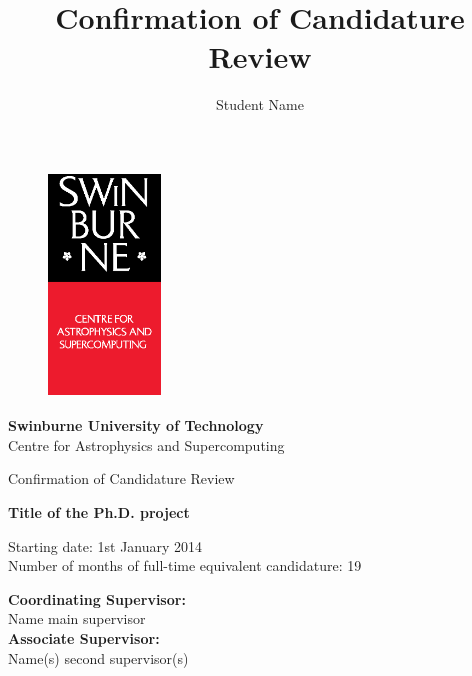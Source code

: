 \documentclass[useAMS,usenatbib,onecolumn]{mnras}
\title{Confirmation of Candidature Review}
\author[Student Name]
 {Student Name}
\begin{document}
\fontsize{11}{12.5}\selectfont
\begin{center}

\begin{figure}
\begin{center}
\includegraphics[height=6cm,width=3cm]{./astro_v.eps}
\end{center}
\end{figure}

{\bf \LARGE S\Large winburne \LARGE U\Large niversity of  \LARGE T\Large echnology\\
\vspace{0.5cm}}
\LARGE C\Large entre for \LARGE A\Large strophysics and \LARGE S\Large upercomputing\\
\vspace{0.5cm}

\large Confirmation of Candidature Review\\
\vspace{0.5cm}



\Huge{\bf Title of the Ph.D. project}

\vspace{3cm}
\large{Starting date: 1st January 2014\\}
\vspace{0.2cm}
\large{Number of months of full-time equivalent candidature: 19}
\vspace{0.5cm}
\end{center}


\begin{flushleft}
{\bf Coordinating Supervisor:}\\
Name main supervisor\\
\vspace{0.5cm}
{\bf Associate Supervisor:}\\
Name(s) second supervisor(s)\\
\end{flushleft}
\end{document}
